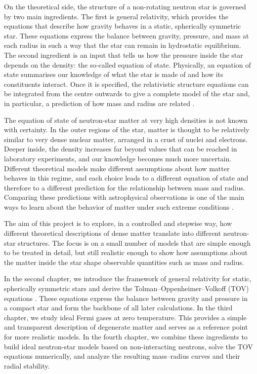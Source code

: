 On the theoretical side, the structure of a non-rotating neutron star is
governed by two main ingredients. The first is general relativity, which
provides the equations that describe how gravity behaves in a static,
spherically symmetric star. These equations express the balance between
gravity, pressure, and mass at each radius in such a way that the star can
remain in hydrostatic equilibrium. The second ingredient is an input that tells
us how the pressure inside the star depends on the density: the so-called
equation of state. Physically, an equation of state summarises our knowledge
of what the star is made of and how its constituents interact. Once it is
specified, the relativistic structure equations can be integrated from the
centre outwards to give a complete model of the star and, in particular, a
prediction of how mass and radius are related \cite{LattimerPrakash2004}.

The equation of state of neutron-star matter at very high densities is not
known with certainty. In the outer regions of the star, matter is thought to
be relatively similar to very dense nuclear matter, arranged in a crust of
nuclei and electrons. Deeper inside, the density increases far beyond values
that can be reached in laboratory experiments, and our knowledge becomes much
more uncertain. Different theoretical models make different assumptions about
how matter behaves in this regime, and each choice leads to a different
equation of state and therefore to a different prediction for the relationship
between mass and radius. Comparing these predictions with astrophysical
observations is one of the main ways to learn about the behavior of matter
under such extreme conditions \cite{LattimerPrakash2004}.

The aim of this project is to explore, in a controlled and stepwise way, how
different theoretical descriptions of dense matter translate into different
neutron-star structures. The focus is on a small number of models that are
simple enough to be treated in detail, but still realistic enough to show how
assumptions about the matter inside the star shape observable quantities such
as mass and radius. 

In the second chapter, we
introduce the framework of general relativity for static, spherically symmetric
stars and derive the Tolman--Oppenheimer--Volkoff (TOV) equations \cite{tolman1939,oppenheimer1939}.
These equations express the balance between
gravity and pressure in a compact star and form the backbone of all later
calculations. In the third chapter, we study ideal Fermi gases at zero
temperature. This provides a simple and transparent description of degenerate
matter and serves as a reference point for more realistic models. In the fourth
chapter, we combine these ingredients to build ideal neutron-star models based
on non-interacting neutrons, solve the TOV equations numerically, and analyze
the resulting mass--radius curves and their radial stability.

